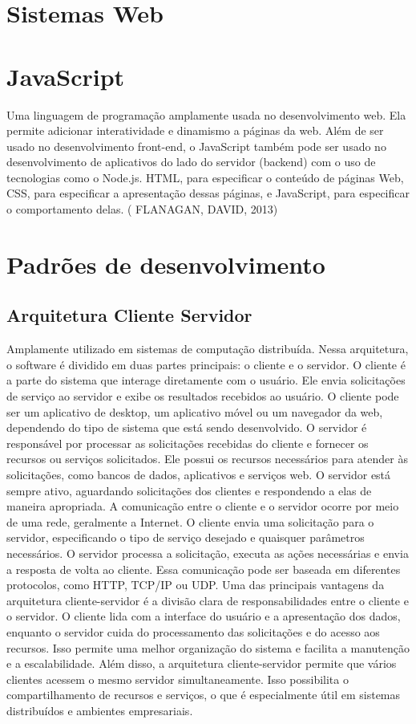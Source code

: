 \section{Sistemas Web}

\section{JavaScript}
Uma linguagem de programação amplamente usada no desenvolvimento web. Ela permite adicionar interatividade e dinamismo a páginas da web. Além de ser usado no desenvolvimento front-end, o JavaScript também pode ser usado no desenvolvimento de aplicativos do lado do servidor (backend) com o uso de tecnologias como o Node.js. HTML, para especificar o conteúdo de páginas Web, CSS, para especificar a apresentação dessas páginas, e JavaScript, para especificar o comportamento delas. ( FLANAGAN, DAVID, 2013) 


\section{Padrões de desenvolvimento}

\subsection{Arquitetura Cliente Servidor}
Amplamente utilizado em sistemas de computação distribuída. Nessa arquitetura, o software é dividido em duas partes principais: o cliente e o servidor.
O cliente é a parte do sistema que interage diretamente com o usuário. Ele envia solicitações de serviço ao servidor e exibe os resultados recebidos ao usuário. O cliente pode ser um aplicativo de desktop, um aplicativo móvel ou um navegador da web, dependendo do tipo de sistema que está sendo desenvolvido.
O servidor é responsável por processar as solicitações recebidas do cliente e fornecer os recursos ou serviços solicitados. Ele possui os recursos necessários para atender às solicitações, como bancos de dados, aplicativos e serviços web. O servidor está sempre ativo, aguardando solicitações dos clientes e respondendo a elas de maneira apropriada.
A comunicação entre o cliente e o servidor ocorre por meio de uma rede, geralmente a Internet. O cliente envia uma solicitação para o servidor, especificando o tipo de serviço desejado e quaisquer parâmetros necessários. O servidor processa a solicitação, executa as ações necessárias e envia a resposta de volta ao cliente. Essa comunicação pode ser baseada em diferentes protocolos, como HTTP, TCP/IP ou UDP.
Uma das principais vantagens da arquitetura cliente-servidor é a divisão clara de responsabilidades entre o cliente e o servidor. O cliente lida com a interface do usuário e a apresentação dos dados, enquanto o servidor cuida do processamento das solicitações e do acesso aos recursos. Isso permite uma melhor organização do sistema e facilita a manutenção e a escalabilidade.
Além disso, a arquitetura cliente-servidor permite que vários clientes acessem o mesmo servidor simultaneamente. Isso possibilita o compartilhamento de recursos e serviços, o que é especialmente útil em sistemas distribuídos e ambientes empresariais.

